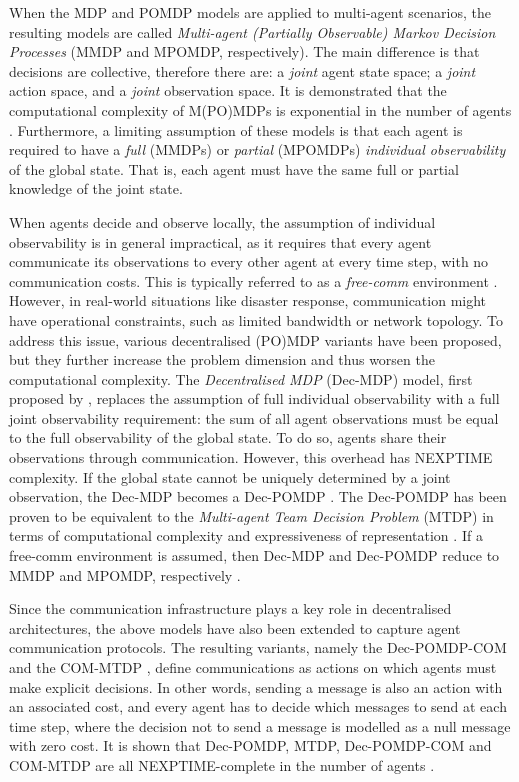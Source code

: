 When the MDP and POMDP models are applied to multi-agent scenarios, the resulting models
are called \emph{Multi-agent (Partially Observable) Markov Decision Processes} (MMDP and
MPOMDP, respectively). The main difference is that decisions are collective, therefore
there are: a \emph{joint} agent state space; a \emph{joint} action space, and a
\emph{joint} observation space. It is demonstrated that the computational complexity of
M(PO)MDPs is exponential in the number of agents \cite{redding2012}. Furthermore,
a limiting assumption of these models is that each agent is required to have a \emph{full}
(MMDPs) or \emph{partial} (MPOMDPs) \emph{individual observability} of the global state.
That is, each agent must have the same full or partial knowledge of the joint state.

When agents decide and observe locally, the assumption of individual observability is in
general impractical, as it requires that every agent communicate its observations to
every other agent at every time step, with no communication costs. This is typically
referred to as a \emph{free-comm} environment \cite{ponda2015}. However, in real-world
situations like disaster response, communication might have operational constraints, such
as limited bandwidth or network topology. To address this issue, various decentralised
(PO)MDP variants have been proposed, but they further increase the problem dimension
and thus worsen the computational complexity. The \emph{Decentralised MDP} (Dec-MDP)
model, first proposed by \cite{bernstein2002}, replaces the assumption of full
individual observability with a full joint observability requirement: the sum of all agent
observations must be equal to the full observability of the global state. To do so, agents
share their observations through communication. However, this overhead has NEXPTIME
complexity. If the global state cannot be uniquely determined by a joint observation, the
Dec-MDP becomes a Dec-POMDP \cite{bernstein2002}. The Dec-POMDP has been proven to be
equivalent to the \emph{Multi-agent Team Decision Problem} (MTDP) \cite{pynadath2002} in
terms of computational complexity and expressiveness of representation \cite{seuken2008}.
If a free-comm environment is assumed, then Dec-MDP and Dec-POMDP reduce to MMDP and
MPOMDP, respectively \cite{goldman2004}.

Since the communication infrastructure plays a key role in decentralised architectures,
the above models have also been extended to capture agent communication protocols. The
resulting variants, namely the Dec-POMDP-COM \cite{goldman2003} and the COM-MTDP
\cite{pynadath2002}, define communications as actions on which agents must make explicit
decisions. In other words, sending a message is also an action with an associated cost,
and every agent has to decide which messages to send at each time step, where the decision
not to send a message is modelled as a null message with zero cost. It is shown that
Dec-POMDP, MTDP, Dec-POMDP-COM and COM-MTDP are all NEXPTIME-complete in the number of
agents \cite{seuken2008}.

